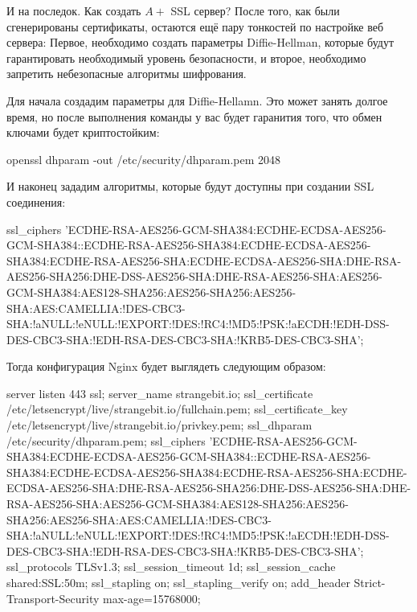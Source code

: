 И на последок. Как создать $A+$ SSL сервер? После того, как были сгенерированы
сертификаты, остаются ещё пару тонкостей по настройке веб сервера: Первое, необходимо
создать параметры Diffie-Hellman, которые будут гарантировать необходимый уровень
безопасности, и второе, необходимо запретить небезопасные алгоритмы шифрования.

Для начала создадим параметры для Diffie-Hellamn. Это может занять долгое время, но
после выполнения команды у вас будет гаранития того, что обмен ключами будет 
криптостойким:

\begin{python}
openssl dhparam -out /etc/security/dhparam.pem 2048
\end{python}

И наконец зададим алгоритмы, которые будут доступны при создании SSL соединения:

\begin{python}
    ssl_ciphers 'ECDHE-RSA-AES256-GCM-SHA384:ECDHE-ECDSA-AES256-GCM-SHA384::ECDHE-RSA-AES256-SHA384:ECDHE-ECDSA-AES256-SHA384:ECDHE-RSA-AES256-SHA:ECDHE-ECDSA-AES256-SHA:DHE-RSA-AES256-SHA256:DHE-DSS-AES256-SHA:DHE-RSA-AES256-SHA:AES256-GCM-SHA384:AES128-SHA256:AES256-SHA256:AES256-SHA:AES:CAMELLIA:!DES-CBC3-SHA:!aNULL:!eNULL:!EXPORT:!DES:!RC4:!MD5:!PSK:!aECDH:!EDH-DSS-DES-CBC3-SHA:!EDH-RSA-DES-CBC3-SHA:!KRB5-DES-CBC3-SHA';
\end{python}

Тогда конфигурация Nginx будет выглядеть следующим образом:

\begin{python}
server {
    listen 443 ssl;
    server_name strangebit.io;
    ssl_certificate /etc/letsencrypt/live/strangebit.io/fullchain.pem;
    ssl_certificate_key /etc/letsencrypt/live/strangebit.io/privkey.pem;
    ssl_dhparam /etc/security/dhparam.pem;
    ssl_ciphers 'ECDHE-RSA-AES256-GCM-SHA384:ECDHE-ECDSA-AES256-GCM-SHA384::ECDHE-RSA-AES256-SHA384:ECDHE-ECDSA-AES256-SHA384:ECDHE-RSA-AES256-SHA:ECDHE-ECDSA-AES256-SHA:DHE-RSA-AES256-SHA256:DHE-DSS-AES256-SHA:DHE-RSA-AES256-SHA:AES256-GCM-SHA384:AES128-SHA256:AES256-SHA256:AES256-SHA:AES:CAMELLIA:!DES-CBC3-SHA:!aNULL:!eNULL:!EXPORT:!DES:!RC4:!MD5:!PSK:!aECDH:!EDH-DSS-DES-CBC3-SHA:!EDH-RSA-DES-CBC3-SHA:!KRB5-DES-CBC3-SHA';
    ssl_protocols TLSv1.3;
    ssl_session_timeout 1d;
    ssl_session_cache shared:SSL:50m;
    ssl_stapling on;
    ssl_stapling_verify on;
    add_header Strict-Transport-Security max-age=15768000;
}
\end{python}

